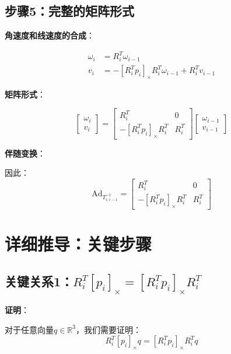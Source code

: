 \documentclass[12pt,a4paper]{article}
\begin{document}
\subsection{步骤5：完整的矩阵形式}

\textbf{角速度和线速度的合成}：

\begin{align}
\omega_i &= R_i^T \omega_{i-1} \\
v_i &= -[R_i^T p_i]_{\times} R_i^T \omega_{i-1} + R_i^T v_{i-1}
\end{align}

\textbf{矩阵形式}：

\begin{equation}
\begin{bmatrix} \omega_i \\ v_i \end{bmatrix} = \begin{bmatrix}
R_i^T & 0 \\
-[R_i^T p_i]_{\times} R_i^T & R_i^T
\end{bmatrix} \begin{bmatrix} \omega_{i-1} \\ v_{i-1} \end{bmatrix}
\end{equation}

\textbf{伴随变换}：

因此：
\begin{equation}
\text{Ad}_{T_{i,i-1}^{-1}} = \begin{bmatrix}
R_i^T & 0 \\
-[R_i^T p_i]_{\times} R_i^T & R_i^T
\end{bmatrix}
\end{equation}

\section{详细推导：关键步骤}

\subsection{关键关系1：$R_i^T [p_i]_{\times} = [R_i^T p_i]_{\times} R_i^T$}

\textbf{证明}：

对于任意向量$q \in \mathbb{R}^3$，我们需要证明：
\begin{equation}
R_i^T [p_i]_{\times} q = [R_i^T p_i]_{\times} R_i^T q
\end{equation}
\end{document}
